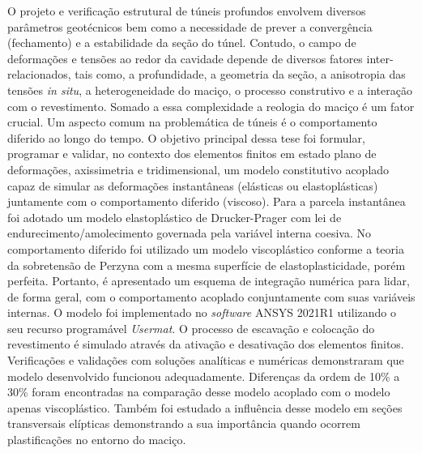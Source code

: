 O projeto e verificação estrutural de túneis profundos envolvem diversos parâmetros geotécnicos bem como a necessidade de prever a convergência (fechamento) e a estabilidade da seção do túnel. Contudo, o campo de deformações e tensões ao redor da cavidade depende de diversos fatores inter-relacionados, tais como, a profundidade, a geometria da seção, a anisotropia das tensões \textit{in situ}, a heterogeneidade do maciço, o processo construtivo e a interação com o revestimento. Somado a essa complexidade a reologia do maciço é um fator crucial. Um aspecto comum na problemática de túneis é o comportamento diferido ao longo do tempo. O objetivo principal dessa tese foi formular, programar e validar, no contexto dos elementos finitos em estado plano de deformações, axissimetria e tridimensional, um modelo constitutivo acoplado capaz de simular as deformações instantâneas (elásticas ou elastoplásticas) juntamente com o comportamento diferido (viscoso). Para a parcela instantânea foi adotado um modelo elastoplástico de Drucker-Prager com lei de endurecimento/amolecimento governada pela variável interna coesiva. No comportamento diferido foi utilizado um modelo viscoplástico conforme a teoria da sobretensão de Perzyna com a mesma superfície de elastoplasticidade, porém perfeita. Portanto, é apresentado um esquema de integração numérica para lidar, de forma geral, com o comportamento acoplado conjuntamente com suas variáveis internas. O modelo foi implementado no \textit{software} ANSYS 2021R1 utilizando o seu recurso programável \textit{Usermat}. O processo de escavação e colocação do revestimento é simulado através da ativação e desativação dos elementos finitos. Verificações e validações com soluções analíticas e numéricas demonstraram que modelo desenvolvido funcionou adequadamente. Diferenças da ordem de 10\% a 30\% foram encontradas na comparação desse modelo acoplado com o modelo apenas viscoplástico. Também foi estudado a influência desse modelo em seções transversais elípticas demonstrando a sua importância quando ocorrem plastificações no entorno do maciço.